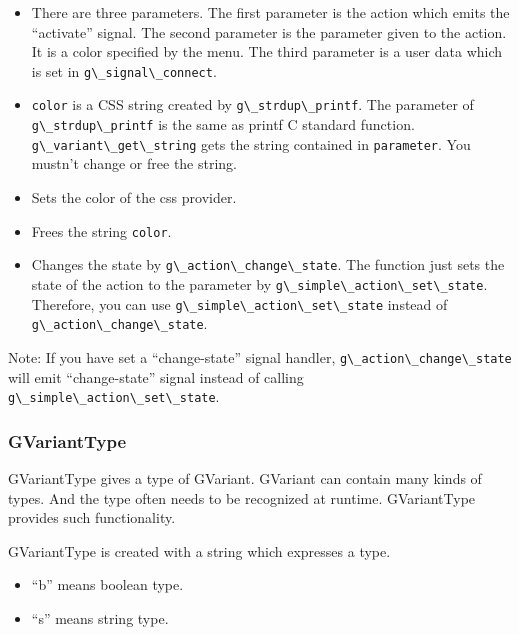 \begin{itemize}
\tightlist
\item
  There are three parameters. The first parameter is the action which
  emits the ``activate'' signal. The second parameter is the parameter
  given to the action. It is a color specified by the menu. The third
  parameter is a user data which is set in
  \passthrough{\lstinline!g\_signal\_connect!}.
\item
  \passthrough{\lstinline!color!} is a CSS string created by
  \passthrough{\lstinline!g\_strdup\_printf!}. The parameter of
  \passthrough{\lstinline!g\_strdup\_printf!} is the same as printf C
  standard function. \passthrough{\lstinline!g\_variant\_get\_string!}
  gets the string contained in \passthrough{\lstinline!parameter!}. You
  mustn't change or free the string.
\item
  Sets the color of the css provider.
\item
  Frees the string \passthrough{\lstinline!color!}.
\item
  Changes the state by
  \passthrough{\lstinline!g\_action\_change\_state!}. The function just
  sets the state of the action to the parameter by
  \passthrough{\lstinline!g\_simple\_action\_set\_state!}. Therefore,
  you can use \passthrough{\lstinline!g\_simple\_action\_set\_state!}
  instead of \passthrough{\lstinline!g\_action\_change\_state!}.
\end{itemize}

Note: If you have set a ``change-state'' signal handler,
\passthrough{\lstinline!g\_action\_change\_state!} will emit
``change-state'' signal instead of calling
\passthrough{\lstinline!g\_simple\_action\_set\_state!}.

\hypertarget{gvarianttype}{%
\subsubsection{GVariantType}\label{gvarianttype}}

GVariantType gives a type of GVariant. GVariant can contain many kinds
of types. And the type often needs to be recognized at runtime.
GVariantType provides such functionality.

GVariantType is created with a string which expresses a type.

\begin{itemize}
\tightlist
\item
  ``b'' means boolean type.
\item
  ``s'' means string type.
\end{itemize}


